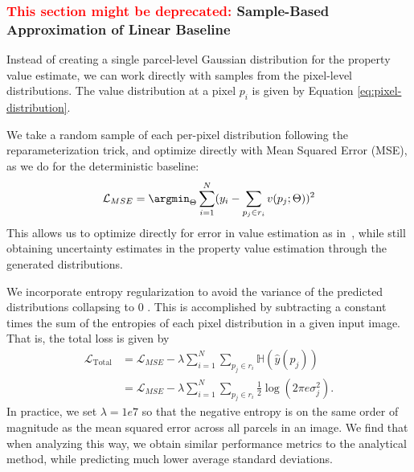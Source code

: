 \subsubsection{\textcolor{red}{This section might be deprecated:} Sample-Based Approximation of Linear Baseline}
\label{sec:sampling}

Instead of creating a single parcel-level Gaussian distribution for the property value estimate, we can work directly with samples from the pixel-level distributions. The value distribution at a pixel $p_i$ is given by Equation \ref{eq:pixel-distribution}.

We take a random sample of each per-pixel distribution following the reparameterization trick, and optimize directly with Mean Squared Error (MSE), as we do for the deterministic baseline:
\begin{equation}
   \mathcal{L}_{MSE}=\argmin_\Theta \sum_{i=1}^{N}(y_i -\sum_{p_j\in r_i} v( p_j; \Theta) )^2
\end{equation}
This allows us to optimize directly for error in value estimation as in~\cite{jacobs2018weakly}, while still obtaining uncertainty estimates in the property value estimation through the generated distributions.

We incorporate entropy regularization to avoid the variance of the predicted distributions collapsing to 0 \cite{Kingma2014AutoEncodingVB}. This is accomplished by subtracting a constant times the sum of the entropies of each pixel distribution in a given input image. That is, the total loss is given by
\begin{align}
    \mathcal{L}_{\mathrm{Total}} &= \mathcal{L}_{MSE} - \lambda\sum_{i=1}^N \sum_{p_j \in r_i} \mathbb{H}\left(\hat{y}(p_j)\right) \\
    &= \mathcal{L}_{MSE} - \lambda \sum_{i=1}^N \sum_{p_j \in r_i} \frac{1}{2} \log\left(2\pi e \sigma_j^2\right).
\end{align}
In practice, we set $\lambda = 1e7$ so that the negative entropy is on the same order of magnitude as the mean squared error across all parcels in an image. We find that when analyzing this way, we obtain similar performance metrics to the analytical method, while predicting much lower average standard deviations.
